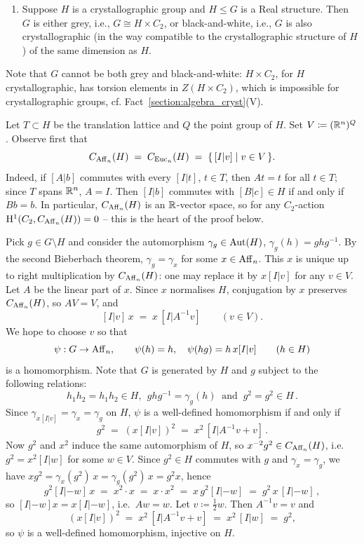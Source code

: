 \begin{enumerate}[label=\textnormal{(\Roman*)}]
\item
  Suppose $H$ is a crystallographic group and $H \leq G$ is a Real structure. Then $G$ is either grey, i.e.,
  $G \cong H \times C_2$, or black-and-white, i.e., $G$ is also crystallographic (in the way compatible to the crystallographic structure of $H$) of the same dimension as $H$.
\end{enumerate}

Note that $G$ cannot be both grey and black-and-white: $H \times C_2$, for $H$ crystallographic, has torsion elements in $Z(H \times C_2)$, which is impossible for crystallographic groups, cf. Fact~\ref{section:algebra_cryst}(V).

\begin{just}
  Let $T\subset H$ be the translation lattice and $Q$ the point group of $H$.
Set $V\coloneqq ({\mathbb R}^n)^Q$. Observe first that
\[
C_{\operatorname{Aff}_n}(H) \;=\; C_{\operatorname{Euc}_n}(H) \;=\; \{\,[I|v] \mid v\in V\,\}.
\]
Indeed, if $[A|b]$ commutes with every $[I|t]$, $t\in T$, then $At=t$ for all $t\in T$; since $T$ spans ${\mathbb R}^n$, $A=I$.
Then $[I|b]$ commutes with $[B|c]\in H$ if and only if $Bb=b$. In particular, $C_{\operatorname{Aff}_n}(H)$ is an ${\mathbb R}$-vector space, so for any $C_2$-action $\mathrm{H}^1 (C_2, C_{\operatorname{Aff}_n}(H))=0$ -- this is the heart of the proof below.

Pick $g\in G\setminus H$ and consider the automorphism $\gamma_g\in\operatorname{Aut}(H)$, $\gamma_g(h)=ghg^{-1}$.
By the second Bieberbach theorem, $\gamma_g=\gamma_x$ for some $x\in\operatorname{Aff}_n$.
This $x$ is unique up to right multiplication by $C_{\operatorname{Aff}_n}(H)$: one may replace it by $x[I|v]$ for any $v\in V$.
Let $A$ be the linear part of $x$. Since $x$ normalises $H$, conjugation by $x$ preserves $C_{\operatorname{Aff}_n}(H)$, so $AV=V$, and
\[
[I|v]\,x \;=\; x\,[I|A^{-1}v] \qquad (v\in V).
\]
We hope to choose $v$ so that
\[
\psi : G\to\operatorname{Aff}_n,\qquad \psi(h)=h,\quad \psi(hg)=h\,x[I|v]\qquad (h\in H)
\]
is a homomorphism. Note that $G$ is generated by $H$ and $g$ subject to the following relations:
\[ h_1h_2 = h_1h_2 \in H, \ \ ghg^{-1}=\gamma_g(h) \ \mbox{ and } \ g^2=g^2\in H \, . \]
Since $\gamma_{x[I|v]}=\gamma_x=\gamma_g$ on $H$,
$\psi$ is a well-defined homomorphism if and only if
\[
g^2 \;=\; (x[I|v])^2 \;=\; x^2\,[I|A^{-1}v+v]\,.
\]
Now $g^2$ and $x^2$ induce the same automorphism of $H$, so $x^{-2}g^2\in C_{\operatorname{Aff}_n}(H)$, i.e.\ $g^2=x^2[I|w]$ for some $w\in V$.
Since $g^2\in H$ commutes with $g$ and $\gamma_x=\gamma_g$, we have $xg^2=\gamma_x(g^2)\,x=\gamma_g(g^2)\,x=g^2x$, hence
\[
g^2[I|-w]\,x \;=\; x^2\cdot x \;=\; x\cdot x^2 \;=\; x\,g^2[I|-w] \;=\; g^2\,x\,[I|-w]\,,
\]
so $[I|-w]x=x[I|-w]$, i.e.\ $Aw=w$.
Let $v\coloneqq\tfrac12 w$. Then $A^{-1}v=v$ and
\[
(x[I|v])^2 \;=\; x^2\,[I|A^{-1}v+v] \;=\; x^2\,[I|w] \;=\; g^2 ,
\]
so $\psi$ is a well-defined homomorphism, injective on $H$.


\end{just}
